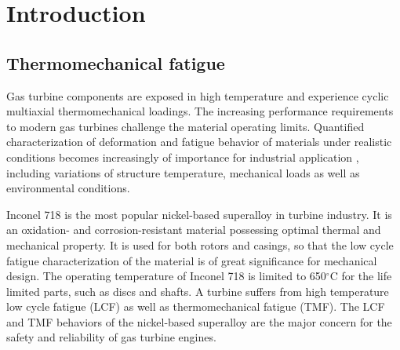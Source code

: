 ﻿\chapter{Introduction}

\section{Thermomechanical fatigue}
\noindent
Gas turbine components are exposed in high temperature and experience cyclic multiaxial thermomechanical loadings. The increasing performance requirements to modern gas turbines challenge the material operating limits. Quantified characterization of deformation and fatigue behavior of materials under realistic conditions becomes increasingly of importance for industrial application \cite{harrison1996modelling}, including variations of structure temperature, mechanical loads as well as environmental conditions. 

Inconel 718 is the most popular nickel-based superalloy in turbine industry. It is an oxidation- and corrosion-resistant material possessing optimal thermal and mechanical property. 
It is used for both rotors and casings, so that the low cycle fatigue characterization of the material is of great significance for mechanical design. The operating temperature of Inconel 718 is limited to 650$^\circ$C for the life limited parts, such as discs and shafts.
A turbine suffers from high temperature low cycle fatigue (LCF) as well as thermomechanical fatigue (TMF).
The LCF and TMF behaviors of the nickel-based superalloy are the major concern for the safety and reliability of gas turbine engines.


